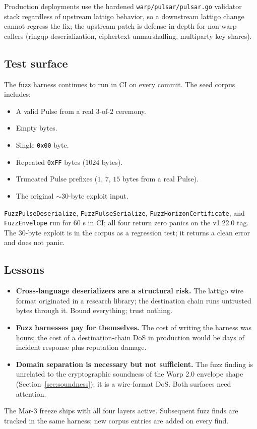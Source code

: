 Production deployments use the hardened \texttt{warp/pulsar/pulsar.go} validator stack regardless of upstream lattigo behavior, so a downstream lattigo change cannot regress the fix; the upstream patch is defense-in-depth for non-warp callers (ringqp deserialization, ciphertext unmarshalling, multiparty key shares).

\subsection{Test surface}

The fuzz harness continues to run in CI on every commit. The seed corpus includes:
\begin{itemize}[leftmargin=2em,nosep]
  \item A valid Pulse from a real $3$-of-$2$ ceremony.
  \item Empty bytes.
  \item Single \texttt{0x00} byte.
  \item Repeated \texttt{0xFF} bytes ($1024$ bytes).
  \item Truncated Pulse prefixes ($1$, $7$, $15$ bytes from a real Pulse).
  \item The original $\sim 30$-byte exploit input.
\end{itemize}

\texttt{FuzzPulseDeserialize}, \texttt{FuzzPulseSerialize}, \texttt{FuzzHorizonCertificate}, and \texttt{FuzzEnvelope} run for 60 s in CI; all four return zero panics on the v1.22.0 tag. The 30-byte exploit is in the corpus as a regression test; it returns a clean error and does not panic.

\subsection{Lessons}

\begin{itemize}[leftmargin=2em,nosep]
  \item \textbf{Cross-language deserializers are a structural risk.} The lattigo wire format originated in a research library; the destination chain runs untrusted bytes through it. Bound everything; trust nothing.
  \item \textbf{Fuzz harnesses pay for themselves.} The cost of writing the harness was hours; the cost of a destination-chain DoS in production would be days of incident response plus reputation damage.
  \item \textbf{Domain separation is necessary but not sufficient.} The fuzz finding is unrelated to the cryptographic soundness of the Warp 2.0 envelope shape (Section~\ref{sec:soundness}); it is a wire-format DoS. Both surfaces need attention.
\end{itemize}

The Mar-3 freeze ships with all four layers active. Subsequent fuzz finds are tracked in the same harness; new corpus entries are added on every find.
